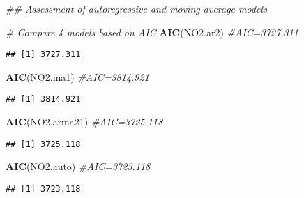 \documentclass[
]{article}
\newenvironment{Shaded}{\begin{snugshade}}{\end{snugshade}}
\newcommand{\CommentTok}[1]{\textcolor[rgb]{0.56,0.35,0.01}{\textit{#1}}}
\newcommand{\KeywordTok}[1]{\textcolor[rgb]{0.13,0.29,0.53}{\textbf{#1}}}
\newcommand{\NormalTok}[1]{#1}
\begin{document}
\begin{Shaded}
\begin{Highlighting}[]
\CommentTok{## Assessment of autoregressive and moving average models}

\CommentTok{# Compare 4 models based on AIC}
\KeywordTok{AIC}\NormalTok{(NO2.ar2) }\CommentTok{#AIC=3727.311}
\end{Highlighting}
\end{Shaded}

\begin{verbatim}
## [1] 3727.311
\end{verbatim}

\begin{Shaded}
\begin{Highlighting}[]
\KeywordTok{AIC}\NormalTok{(NO2.ma1) }\CommentTok{#AIC=3814.921}
\end{Highlighting}
\end{Shaded}

\begin{verbatim}
## [1] 3814.921
\end{verbatim}

\begin{Shaded}
\begin{Highlighting}[]
\KeywordTok{AIC}\NormalTok{(NO2.arma21) }\CommentTok{#AIC=3725.118}
\end{Highlighting}
\end{Shaded}

\begin{verbatim}
## [1] 3725.118
\end{verbatim}

\begin{Shaded}
\begin{Highlighting}[]
\KeywordTok{AIC}\NormalTok{(NO2.auto) }\CommentTok{#AIC=3723.118}
\end{Highlighting}
\end{Shaded}

\begin{verbatim}
## [1] 3723.118
\end{verbatim}
\end{document}
